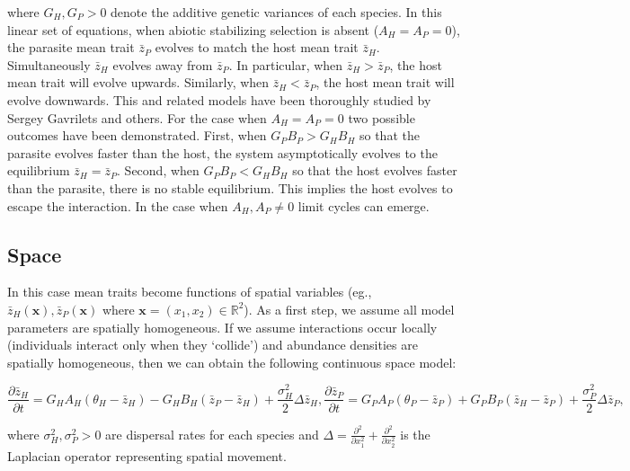 \documentclass{article}
\begin{document}
where \(G_H,G_P>0\) denote the additive genetic variances of each
species. In this linear set of equations, when abiotic stabilizing
selection is absent (\(A_H=A_P=0\)), the parasite mean trait
\(\bar z_P\) evolves to match the host mean trait \(\bar z_H\).
Simultaneously \(\bar z_H\) evolves away from \(\bar z_P\). In
particular, when \(\bar z_H>\bar z_P\), the host mean trait will evolve
upwards. Similarly, when \(\bar z_H<\bar z_P\), the host mean trait will
evolve downwards. This and related models have been thoroughly studied
by Sergey Gavrilets and others. For the case when \(A_H=A_P=0\) two
possible outcomes have been demonstrated. First, when \(G_PB_P>G_HB_H\)
so that the parasite evolves faster than the host, the system
asymptotically evolves to the equilibrium \(\bar z_H=\bar z_P\). Second,
when \(G_PB_P<G_HB_H\) so that the host evolves faster than the
parasite, there is no stable equilibrium. This implies the host evolves
to escape the interaction. In the case when \(A_H,A_P\neq0\) limit
cycles can emerge.

\hypertarget{space}{%
\subsection{Space}\label{space}}

In this case mean traits become functions of spatial variables (eg.,
\(\bar z_H(\pmb x),\bar z_P(\pmb x)\) where
\(\pmb x=(x_1,x_2)\in\mathbb R^2\)). As a first step, we assume all
model parameters are spatially homogeneous. If we assume interactions
occur locally (individuals interact only when they `collide') and
abundance densities are spatially homogeneous, then we can obtain the
following continuous space model:

\begin{subequations}\label{deterministic}
  \begin{equation}
    \frac{\partial\bar z_H}{\partial t}=G_HA_H(\theta_H-\bar z_H)-G_HB_H(\bar z_P-\bar z_H)+\frac{\sigma^2_H}{2}\Delta\bar z_H,
  \end{equation}
  \begin{equation}
    \frac{\partial\bar z_P}{\partial t}=G_PA_P(\theta_P-\bar z_P)+G_PB_P(\bar z_H-\bar z_P)+\frac{\sigma^2_P}{2}\Delta\bar z_P,
  \end{equation}
\end{subequations}

where \(\sigma^2_H,\sigma^2_P>0\) are dispersal rates for each species
and
\(\Delta=\frac{\partial^2}{\partial x_1^2}+\frac{\partial^2}{\partial x_2^2}\)
is the Laplacian operator representing spatial movement.
\end{document}
